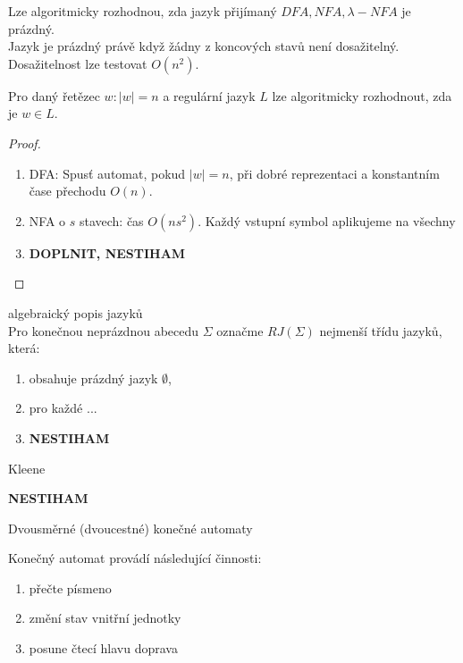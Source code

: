 \documentclass[../main.tex]{subfiles}
\begin{document}
\begin{theorem}
    Lze algoritmicky rozhodnou, zda jazyk přijímaný $DFA,NFA,\lambda -NFA$ je prázdný.\\
    Jazyk je prázdný právě když žádny z koncových stavů není dosažitelný. Dosažitelnost lze testovat $O(n^2)$.
\end{theorem}
\begin{theorem}
    Pro daný řetězec $w: |w| = n$ a regulární jazyk $L$ lze algoritmicky rozhodnout, zda je $w\in L$.
    \begin{proof}
        \begin{enumerate}
            \item DFA: Spusť automat, pokud $|w| = n$, při dobré reprezentaci a konstantním čase přechodu $O(n)$.
            \item NFA o $s$ stavech: čas $O(ns^2)$. Každý vstupní symbol aplikujeme na všechny 
            \item \textbf{DOPLNIT, NESTIHAM}
        \end{enumerate}
    \end{proof}
\end{theorem}

\begin{definition}
    algebraický popis jazyků\\

    Pro konečnou neprázdnou abecedu $\Sigma$ označme $RJ(\Sigma)$ nejmenší třídu jazyků, která:
    \begin{enumerate}
        \item obsahuje prázdný jazyk $\emptyset$,
        \item pro každé ... 
        \item \textbf{NESTIHAM}
    \end{enumerate}
\end{definition}
\begin{theorem}
    Kleene
    
    \textbf{NESTIHAM}
\end{theorem}

Dvousměrné (dvoucestné) konečné automaty

Konečný automat provádí následující činnosti:
\begin{enumerate}
    \item přečte písmeno
    \item změní stav vnitřní jednotky
    \item posune čtecí hlavu doprava
\end{enumerate}
\end{document}
